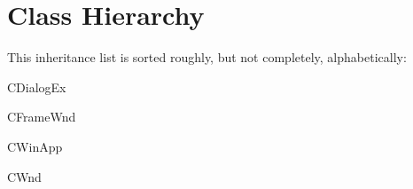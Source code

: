 \section{Class Hierarchy}
This inheritance list is sorted roughly, but not completely, alphabetically\+:\begin{DoxyCompactList}
\item {}
\item C\+Dialog\+Ex\begin{DoxyCompactList}
\item {}
\end{DoxyCompactList}
\item C\+Frame\+Wnd\begin{DoxyCompactList}
\item {}
\end{DoxyCompactList}
\item {}
\begin{DoxyCompactList}
\item {}
\end{DoxyCompactList}
\item C\+Win\+App\begin{DoxyCompactList}
\item {}
\end{DoxyCompactList}
\item C\+Wnd\begin{DoxyCompactList}
\item {}
\end{DoxyCompactList}
\end{DoxyCompactList}

